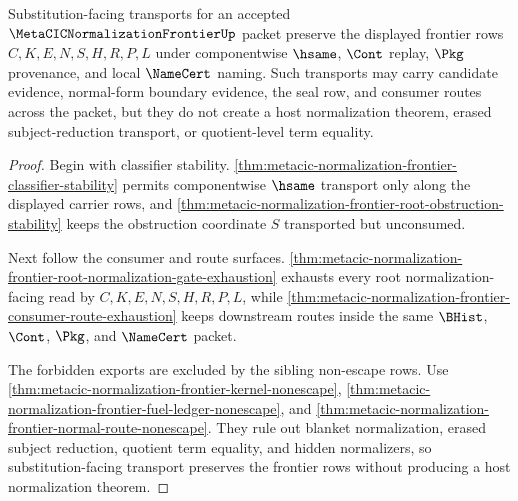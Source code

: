 \begin{theorem}
\label{thm:metacic-normalization-frontier-substitution-stability}
Substitution-facing transports for an accepted $\MetaCICNormalizationFrontierUp$ packet preserve the displayed frontier rows $C,K,E,N,S,H,R,P,L$ under componentwise $\hsame$, $\Cont$ replay, $\Pkg$ provenance, and local $\NameCert$ naming. Such transports may carry candidate evidence, normal-form boundary evidence, the seal row, and consumer routes across the packet, but they do not create a host normalization theorem, erased subject-reduction transport, or quotient-level term equality.
\end{theorem}
\begin{proof}
Begin with classifier stability. \autoref{thm:metacic-normalization-frontier-classifier-stability} permits componentwise $\hsame$ transport only along the displayed carrier rows, and \autoref{thm:metacic-normalization-frontier-root-obstruction-stability} keeps the obstruction coordinate $S$ transported but unconsumed.

Next follow the consumer and route surfaces. \autoref{thm:metacic-normalization-frontier-root-normalization-gate-exhaustion} exhausts every root normalization-facing read by $C,K,E,N,S,H,R,P,L$, while \autoref{thm:metacic-normalization-frontier-consumer-route-exhaustion} keeps downstream routes inside the same $\BHist$, $\Cont$, $\Pkg$, and $\NameCert$ packet.

The forbidden exports are excluded by the sibling non-escape rows. Use \autoref{thm:metacic-normalization-frontier-kernel-nonescape}, \autoref{thm:metacic-normalization-frontier-fuel-ledger-nonescape}, and \autoref{thm:metacic-normalization-frontier-normal-route-nonescape}. They rule out blanket normalization, erased subject reduction, quotient term equality, and hidden normalizers, so substitution-facing transport preserves the frontier rows without producing a host normalization theorem.
\end{proof}
